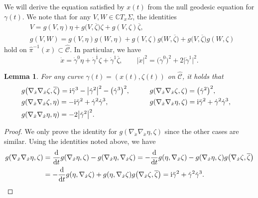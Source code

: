 \documentclass[11pt]{article}
\numberwithin{equation}{section}
\newcommand\ol{\overline}
\newcommand{\wh}{\widehat}
\numberwithin{equation}{section}
\newtheorem{Lemma}[Theorem]{Lemma}
\begin{document}
We will derive the equation satisfied by $x(t)$ from the null geodesic equation for $\gamma(t)$. We note that for any $V, W\in \mathbb{C}T_x\Sigma$, the identities
\begin{align*}
&V=g(V, \eta)\eta+g\bigl(V, \ol\zeta\bigr)\zeta+g(V, \zeta)\ol\zeta, \\
&g(V, W)=g(V, \eta)g(W, \eta)+g(V, \zeta)g\bigl(W, \ol\zeta\bigr)+g\bigl(V, \ol\zeta\bigr)g(W, \zeta)
\end{align*}
hold on $\hat\pi^{-1}(x)\subset\wh{\mathcal{C}}$. In particular, we have
\begin{equation}\label{x-zeta-eta}
\dot x=\dot\gamma^0\eta+\dot\gamma^{\ol1}\zeta+\dot\gamma^1\ol\zeta, \qquad |\dot x|^2=\bigl(\dot\gamma^0\bigr)^2+2\bigl|\dot\gamma^1\bigr|^2.
\end{equation}
\begin{Lemma}
For any curve $\gamma(t)=(x(t), \zeta(t))$ on $\wh{\mathcal{C}}$, it holds that
\begin{alignat}{3}
&g\bigl(\nabla_{\dot x}\nabla_{\dot x}\zeta, \ol\zeta\bigr) ={\rm i}\ddot\gamma^3-\bigl|\dot\gamma^2\bigr|^2-\bigl(\dot\gamma^3\bigr)^2, \qquad&&
g(\nabla_{\dot x}\nabla_{\dot x}\zeta, \zeta) =\bigl(\dot\gamma^2\bigr)^2,& \nonumber \\
&g(\nabla_{\dot x}\nabla_{\dot x}\zeta, \eta) =-{\rm i}\ddot\gamma^2+\dot\gamma^2\dot\gamma^3, \qquad&&
g(\nabla_{\dot x}\nabla_{\dot x}\eta, \zeta) ={\rm i}\ddot\gamma^2+\dot\gamma^2\dot\gamma^3, &\nonumber \\
&g(\nabla_{\dot x}\nabla_{\dot x}\eta, \eta) =-2\bigl|\dot\gamma^2\bigr|^2.&\label{nabla-zeta-eta}
\end{alignat}
\end{Lemma}
\begin{proof}
We only prove the identity for $g(\nabla_{\dot x}\nabla_{\dot x}\eta, \zeta)$ since the other cases are similar. Using the identities noted above, we have
\begin{align*}
g(\nabla_{\dot x}\nabla_{\dot x}\eta, \zeta)
&=\frac{{\rm d}}{{\rm d}t}g(\nabla_{\dot x}\eta, \zeta)-g(\nabla_{\dot x}\eta, \nabla_{\dot x}\zeta) =-\frac{{\rm d}}{{\rm d}t}g(\eta, \nabla_{\dot x}\zeta)-g(\nabla_{\dot x}\eta, \zeta)g\bigl(\nabla_{\dot x}\zeta, \ol\zeta\bigr) \\
&=-\frac{{\rm d}}{{\rm d}t}g(\eta, \nabla_{\dot x}\zeta)+g(\eta, \nabla_{\dot x}\zeta)g\bigl(\nabla_{\dot x}\zeta, \ol\zeta\bigr)
={\rm i}\ddot\gamma^2+\dot\gamma^2\dot\gamma^3.
\tag*{\qed}
\end{align*}
\renewcommand{\qed}{}
\end{proof}
\end{document}
